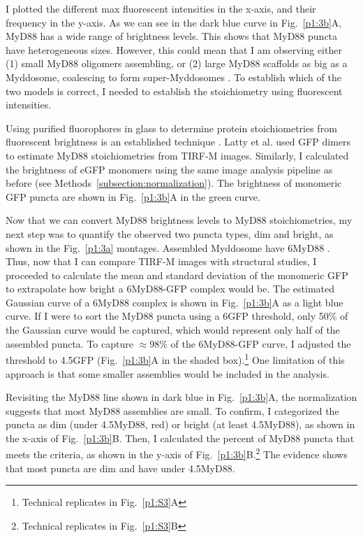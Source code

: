 I plotted the different max fluorescent intensities in the x-axis, and their frequency in the y-axis. As we can see in the dark blue curve in Fig.~\ref{p1:3b}A, MyD88 has a wide range of brightness levels. This shows that MyD88 puncta have heterogeneous sizes. However, this could mean that I am observing either (1) small MyD88 oligomers assembling, or (2) large MyD88 scaffolds as big as a Myddosome, coalescing to form super-Myddosomes \autocite{Latty_2018}. To establish which of the two models is correct, I needed to establish the stoichiometry using fluorescent intensities.

Using purified fluorophores in glass to determine protein stoichiometries from fluorescent brightness is an established technique \autocite{Latty_2018}\autocite{Douglass_2005}. Latty et al. used GFP dimers to estimate MyD88 stoichiometries from TIRF-M images. Similarly, I calculated the brightness of eGFP monomers using the same image analysis pipeline as before (see Methods~\ref{subsection:normalization}). The brightness of monomeric GFP puncta are shown in Fig.~\ref{p1:3b}A in the green curve.

Now that we can convert MyD88 brightness levels to MyD88 stoichiometries, my next step was to quantify the observed two puncta types, dim and bright, as shown in the Fig.~\ref{p1:3a} montages. Assembled Myddosome have 6\times MyD88 \autocite{Lin_2010}. Thus, now that I can compare TIRF-M images with structural studies, I proceeded to calculate the mean and standard deviation of the monomeric GFP to extrapolate how bright a 6\times MyD88-GFP complex would be. The estimated Gaussian curve of a 6\times MyD88 complex is shown in Fig.~\ref{p1:3b}A as a light blue curve. If I were to sort the MyD88 puncta using a 6\times GFP threshold, only 50\% of the Gaussian curve would be captured, which would represent only half of the assembled puncta. To capture $\approx 98\%$ of the 6\times MyD88-GFP curve, I adjusted the threshold to 4.5\times GFP (Fig.~\ref{p1:3b}A in the shaded box).\footnote{Technical replicates in Fig.~\ref{p1:S3}A} One limitation of this approach is that some smaller assemblies would be included in the analysis.

Revisiting the MyD88 line shown in dark blue in Fig.~\ref{p1:3b}A, the normalization suggests that most MyD88 assemblies are small. To confirm, I categorized the puncta as dim (under 4.5\times MyD88, red) or bright (at least 4.5\times MyD88), as shown in the x-axis of Fig.~\ref{p1:3b}B. Then, I calculated the percent of MyD88 puncta that meets the criteria, as shown in the y-axis of Fig.~\ref{p1:3b}B.\footnote{Technical replicates in Fig.~\ref{p1:S3}B} The evidence shows that most puncta are dim and have under 4.5\times MyD88.


